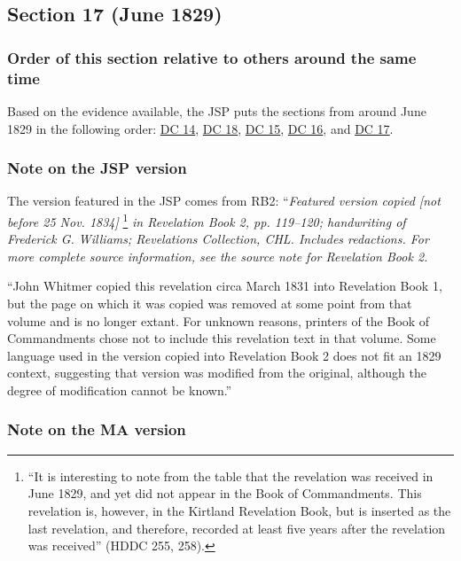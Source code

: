 \subsection{Section 17 (June 1829)}
	\label{DC17}
	
	\subsubsection{Order of this section relative to others around the same time}
	
		Based on the evidence available, the JSP puts the sections from around June 1829 in the following order: \hyperref[DC14]{DC 14}, \hyperref[DC18]{DC 18}, \hyperref[DC15]{DC 15}, \hyperref[DC16]{DC 16}, and \hyperref[DC17]{DC 17}.
	
	\subsubsection{Note on the JSP version}
	
		The version featured in the JSP comes from RB2: ``\textit{Featured version copied [not before 25 Nov. 1834]}%
			\footnote{%
				``It is interesting to note from the table that the revelation was received in June 1829, and yet did not appear in the Book of Commandments. This revelation is, however, in the Kirtland Revelation Book, but is inserted as the last revelation, and therefore, recorded at least five years after the revelation was received'' (HDDC 255, 258). 
				}
		\textit{in Revelation Book 2, pp. 119--120; handwriting of Frederick G. Williams; Revelations Collection, CHL. Includes redactions. For more complete source information, see the source note for Revelation Book 2.}
		
		``John Whitmer copied this revelation circa March 1831 into Revelation Book 1, but the page on which it was copied was removed at some point from that volume and is no longer extant. For unknown reasons, printers of the Book of Commandments chose not to include this revelation text in that volume. Some language used in the version copied into Revelation Book 2 does not fit an 1829 context, suggesting that version was modified from the original, although the degree of modification cannot be known.''
		
	\subsubsection{Note on the MA version}
	
